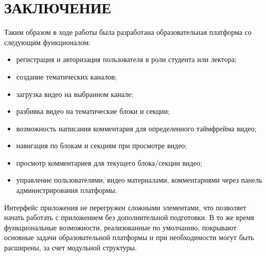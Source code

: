 \section*{ЗАКЛЮЧЕНИЕ}

Таким образом в ходе работы была разработана образовательная платформа со следующим функционалом:
\begin{itemize}[wide,topsep=0pt]
  \itemsep0em
  \item регистрация и авторизация пользователя в роли студента или лектора;
  \item создание тематических каналов;
  \item загрузка видео на выбранном канале;
  \item разбивка видео на тематические блоки и секции;
  \item возможность написания комментария для определенного таймфрейма видео;
  \item навигация по блокам и секциям при просмотре видео;
  \item просмотр комментариев для текущего блока/секции видео;
  \item управление пользователями, видео материалами, комментариями через панель администрирования платформы.
\end{itemize}

Интерфейс приложения не перегружен сложными элементами, что позволяет начать работать с приложением
без дополнительной подготовки. В то же время функциональные возможности, реализованные
по умолчанию, покрывают основные задачи образовательной платформы и при необходимости могут быть
расширены, за счет модульной структуры.